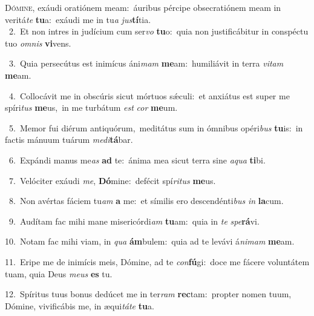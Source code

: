 \lettrine{\initial\textcolor{\initialcolor}{D}}{ómine,} exáudi oratiónem meam:~\dagger áuribus pércipe obsecratiónem meam in veritá\textit{te} \textbf{tu}\-a:~\star exáudi me in tu\textit{a} \textit{jus}\-\textbf{tí}tia.\\
{\numbfont\textcolor{\numbcolor}{~2.}}~Et non intres in judícium cum ser\textit{vo} \textbf{tu}\-o:~\star quia non justificábitur in conspéctu tuo \textit{om}\-\textit{nis} \textbf{vi}\-vens.\par
{\numbfont\textcolor{\numbcolor}{~3.}}~Quia persecútus est inimícus áni\textit{mam} \textbf{me}\-am:~\star humiliávit in terra \textit{vi}\-\textit{tam} \textbf{me}\-am.\par
{\numbfont\textcolor{\numbcolor}{~4.}}~Collocávit me in obscúris sicut mórtuos sǽculi:~\dagger et anxiátus est super me spíri\textit{tus} \textbf{me}\-us,~\star in me turbátum \textit{est} \textit{cor} \textbf{me}\-um.\par
{\numbfont\textcolor{\numbcolor}{~5.}}~Memor fui diérum antiquórum,~\dagger meditátus sum in ómnibus opéri\textit{bus} \textbf{tu}\-is:~\star in factis mánuum tuárum \textit{me}\-\textit{di}\textbf{tá}bar.\par
{\numbfont\textcolor{\numbcolor}{~6.}}~Expándi manus me\textit{as} \textbf{ad} te:~\star ánima mea sicut terra sine \textit{a}\-\textit{qua} \textbf{ti}\-bi.\par
{\numbfont\textcolor{\numbcolor}{~7.}}~Velóciter exáudi \textit{me}\-, \textbf{Dó}\-mine:~\star defécit spí\-\textit{ri}\-\textit{tus} \textbf{me}\-us.\par
{\numbfont\textcolor{\numbcolor}{~8.}}~Non avértas fáciem tu\textit{am} \textbf{a} me:~\star et símilis ero descendénti\textit{bus} \textit{in} \textbf{la}\-cum.\par
{\numbfont\textcolor{\numbcolor}{~9.}}~Audítam fac mihi mane misericórdi\textit{am} \textbf{tu}\-am:~\star quia in \textit{te} \textit{spe}\-\textbf{rá}vi.\par
{\numbfont\textcolor{\numbcolor}{10.}}~Notam fac mihi viam, in \textit{qua} \textbf{ám}\-bulem:~\star quia ad te levávi á\-\textit{ni}\-\textit{mam} \textbf{me}\-am.\par
{\numbfont\textcolor{\numbcolor}{11.}}~Eripe me de inimícis meis, Dómine, ad te \textit{con}\-\textbf{fú}gi:~\star doce me fácere voluntátem tuam, quia Deus \textit{me}\-\textit{us} \textbf{es} tu.\par
{\numbfont\textcolor{\numbcolor}{12.}}~Spíritus tuus bonus dedúcet me in ter\textit{ram} \textbf{rec}\-tam:~\star propter nomen tuum, Dómine, vivificábis me, in æqui\-\textit{tá}\-\textit{te} \textbf{tu}\-a.\par
